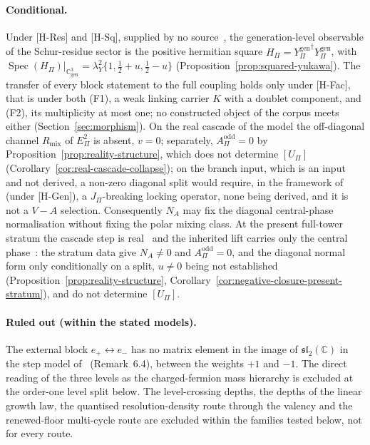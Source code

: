 \documentclass[11pt]{article}
\theoremstyle{definition}
\theoremstyle{remark}
\newcommand{\JPi}{J_{\Pi}}
\newcommand{\Cgen}{\mathbb{C}^{3}_{\mathrm{gen}}}
\newcommand{\Epi}{E_{\Pi}}
\newcommand{\Ygen}{{Y^{\mathrm{gen}}_{\Pi}}}
\newcommand{\Hpi}{H_{\Pi}}
\newcommand{\Upi}{U_{\Pi}}
\newcommand{\Aodd}{A_{\Pi}^{\mathrm{odd}}}
\newcommand{\lamY}{\lambda_{Y}}
\newcommand{\Spec}{\operatorname{Spec}}
\begin{document}
    \paragraph{Conditional.}
      Under [H-Res] and [H-Sq], supplied by no source~\cite{Beau2026q14}, the generation-level observable of the
      Schur-residue sector is the positive hermitian square $\Hpi = \Ygen^{\dagger}\Ygen$, with
      $\Spec(\Hpi)|_{\Cgen} = \lamY^{2}\{1, \tfrac12 + u, \tfrac12 - u\}$
      (Proposition~\ref{prop:squared-yukawa}).
      The transfer of every block statement to the full coupling holds only under [H-Fac], that is under both
      (F1), a weak linking carrier $K$ with a doublet component, and (F2), its multiplicity at most one;
      no constructed object of the corpus meets either (Section~\ref{sec:morphism}).
      On the real cascade of the model the off-diagonal channel $R_{\mathrm{mix}}$ of $\Epi^{2}$ is absent,
      $v = 0$; separately,
      $\Aodd = 0$ by Proposition~\ref{prop:reality-structure}, which does not determine $[\Upi]$
      (Corollary~\ref{cor:real-cascade-collapse});
      on the branch input, which is an input and not derived, a non-zero diagonal split would require, in the
      framework of~\cite{Beau2026prs} (under [H-Gen]), a $\JPi$-breaking locking operator, none being derived, and it is not a $V{-}A$ selection.
      Consequently $N_{A}$ may fix the diagonal central-phase normalisation without fixing the polar mixing
      class.
      At the present full-tower stratum the cascade step is real~\cite{Beau2026prs, Beau2026aar} and the inherited lift
      carries only the central phase~\cite{Beau2026cho}: the stratum data give $N_{A} \neq 0$ and $\Aodd = 0$, and the diagonal normal form only conditionally on a
      split, $u \neq 0$ being not established
      (Proposition~\ref{prop:reality-structure}, Corollary~\ref{cor:negative-closure-present-stratum}), and do not
      determine $[\Upi]$.

    \paragraph{Ruled out (within the stated models).}
      The external block $e_{+} \leftrightarrow e_{-}$ has no matrix element in the image of
      $\mathfrak{sl}_{2}(\mathbb{C})$
      in the step model of~\cite{Beau2026q14} (Remark~6.4), between the weights $+1$ and $-1$.
      The direct reading of the three levels as the charged-fermion mass hierarchy is excluded at the order-one
      level split below.
      The level-crossing depths, the depths of the linear growth law, the quantised resolution-density route through the
      valency and the renewed-floor multi-cycle route are excluded within the families tested below, not for every
      route.
\end{document}
